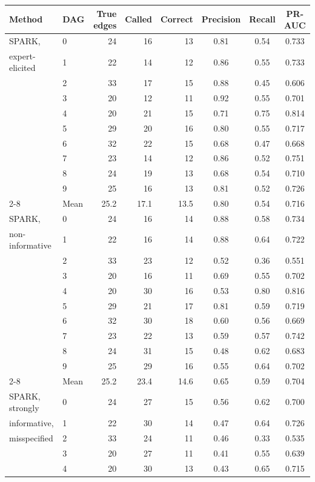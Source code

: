 \begin{tabular}{llrrrccc}
\toprule
Method & DAG & True edges & Called & Correct & Precision & Recall & PR-AUC \\
\midrule
SPARK, & 0 & 24 & 16 & 13 & 0.81 & 0.54 & 0.733 \\
expert-elicited & 1 & 22 & 14 & 12 & 0.86 & 0.55 & 0.733 \\
 & 2 & 33 & 17 & 15 & 0.88 & 0.45 & 0.606 \\
 & 3 & 20 & 12 & 11 & 0.92 & 0.55 & 0.701 \\
 & 4 & 20 & 21 & 15 & 0.71 & 0.75 & 0.814 \\
 & 5 & 29 & 20 & 16 & 0.80 & 0.55 & 0.717 \\
 & 6 & 32 & 22 & 15 & 0.68 & 0.47 & 0.668 \\
 & 7 & 23 & 14 & 12 & 0.86 & 0.52 & 0.751 \\
 & 8 & 24 & 19 & 13 & 0.68 & 0.54 & 0.710 \\
 & 9 & 25 & 16 & 13 & 0.81 & 0.52 & 0.726 \\
\cmidrule{2-8}
 & Mean & 25.2 & 17.1 & 13.5 & 0.80 & 0.54 & 0.716 \\
\midrule
SPARK, & 0 & 24 & 16 & 14 & 0.88 & 0.58 & 0.734 \\
non-informative & 1 & 22 & 16 & 14 & 0.88 & 0.64 & 0.722 \\
 & 2 & 33 & 23 & 12 & 0.52 & 0.36 & 0.551 \\
 & 3 & 20 & 16 & 11 & 0.69 & 0.55 & 0.702 \\
 & 4 & 20 & 30 & 16 & 0.53 & 0.80 & 0.816 \\
 & 5 & 29 & 21 & 17 & 0.81 & 0.59 & 0.719 \\
 & 6 & 32 & 30 & 18 & 0.60 & 0.56 & 0.669 \\
 & 7 & 23 & 22 & 13 & 0.59 & 0.57 & 0.742 \\
 & 8 & 24 & 31 & 15 & 0.48 & 0.62 & 0.683 \\
 & 9 & 25 & 29 & 16 & 0.55 & 0.64 & 0.702 \\
\cmidrule{2-8}
 & Mean & 25.2 & 23.4 & 14.6 & 0.65 & 0.59 & 0.704 \\
\midrule
SPARK, strongly & 0 & 24 & 27 & 15 & 0.56 & 0.62 & 0.700 \\
informative, & 1 & 22 & 30 & 14 & 0.47 & 0.64 & 0.726 \\
misspecified & 2 & 33 & 24 & 11 & 0.46 & 0.33 & 0.535 \\
 & 3 & 20 & 27 & 11 & 0.41 & 0.55 & 0.639 \\
 & 4 & 20 & 30 & 13 & 0.43 & 0.65 & 0.715 \\

\end{tabular}
